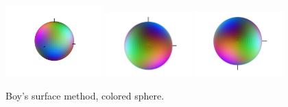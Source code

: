 \documentclass{article}
\begin{document}
	\begin{figure}
		\centering
		\includegraphics[width=0.33\textwidth]{boys}
		\includegraphics[width=0.3\textwidth]{boys_zIn_yRight}
		\includegraphics[width=0.3\textwidth]{boys_zOut_yRight}
		\caption{Boy's surface method, colored sphere.}
	\end{figure}
\end{document}
